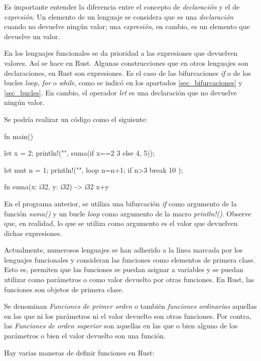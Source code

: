Es importante entender la diferencia entre el concepto de \textit{declaración} y el de \textit{expresión}. Un elemento de un lenguaje se considera que es una \textit{declaración} cuando no devuelve ningún valor; una \textit{expresión}, en cambio, es un elemento que devuelve un valor.

En los lenguajes funcionales se da prioridad a las expresiones que devuelven valores. Así se hace en Rust. Algunas construcciones que en otros lenguajes son declaraciones, en Rust son expresiones. Es el caso de las bifurcaciones \textit{if} o de los bucles \textit{loop, for} o \textit{while}, como se indicó en los apartados \ref{sec_bifurcaciones} y \ref{sec_bucles}. En cambio, el operador \textit{let} es una declaración que no devuelve ningún valor.

Se podría realizar un código como el siguiente:

\vspace{0.7em}
\begin{Codigo}
fn main() {
   let x = 2;
   println!("{}", suma(if x==2 {3} else {4}, 5));
   
   let mut n = 1;
   println!("{}", loop {
      n=n+1;
      if n>3 {
         break 10
      }
   });
}
fn suma(x: i32, y: i32) -> i32 {
   x+y
}
\end{Codigo}

En el programa anterior, se utiliza una bifurcación \textit{if} como argumento de la función \textit{suma()} y un bucle \textit{loop} como argumento de la macro \textit{println!()}. Observe que, en realidad, lo que se utiliza como argumento es el valor que devuelven dichas expresiones. 

Actualmente, numerosos lenguajes se han adherido a la línea marcada por los lenguajes funcionales y consideran las funciones como elementos de primera clase. Esto es, permiten que las funciones se puedan asignar a variables y se puedan utilizar como parámetros o como valor devuelto por otras funciones. En Rust, las funciones son objetos de primera clase.

Se denominan \textit{Funciones de primer orden} o también \textit{funciones ordinarias} aquellas en las que ni los parámetros ni el valor devuelto son otras funciones. Por contra, las \textit{Funciones de orden superior} son aquellas en las que o bien alguno de los parámetros o bien el valor devuelto son una función.

Hay varias maneras de definir funciones en Rust:

